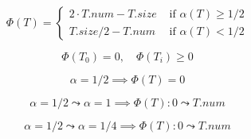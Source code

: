 \begin{frame}{}
  \[
    \Phi(T) = \left.
    \begin{cases}
      2 \cdot T.num - T.size & \text{ if } \alpha(T) \ge 1/2	\\
      T.size/2 - T.num	     & \text{ if } \alpha(T) < 1/2
    \end{cases} \right.
  \]

  \pause
  \[
    \Phi(T_0) = 0,\quad \Phi(T_{i}) \ge 0
  \]

  \pause
  \vspace{0.30cm}
  \[
    \alpha = 1/2 \implies \Phi(T) = 0
  \]

  \vspace{0.30cm}
  \pause
  \[
    \alpha = 1/2 \leadsto \alpha = 1 \implies \Phi(T): 0 \leadsto T.num
  \]

  \pause
  \[
    \alpha = 1/2 \leadsto \alpha = 1/4 \implies \Phi(T): 0 \leadsto T.num
  \]
\end{frame}

